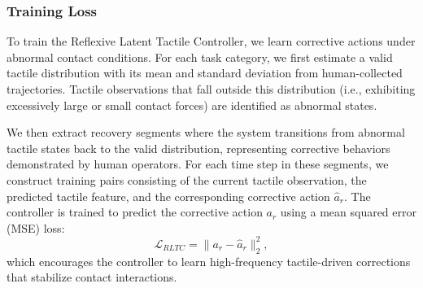 \subsubsection{Training Loss}
To train the Reflexive Latent Tactile Controller, we learn corrective actions under abnormal contact conditions. For each task category, we first estimate a valid tactile distribution with its mean and standard deviation from human-collected trajectories. Tactile observations that fall outside this distribution (i.e., exhibiting excessively large or small contact forces) are identified as abnormal states.

We then extract recovery segments where the system transitions from abnormal tactile states back to the valid distribution, representing corrective behaviors demonstrated by human operators. 
For each time step in these segments, we construct training pairs consisting of the current tactile observation, the predicted tactile feature, and the corresponding corrective action $\hat{a}_r$.
The controller is trained to predict the corrective action $a_r$ using a mean squared error (MSE) loss:
\begin{equation}
\mathcal{L}_{RLTC} = \| a_r - \hat{a}_r \|_2^2,
\end{equation}
which encourages the controller to learn high-frequency tactile-driven corrections that stabilize contact interactions.
